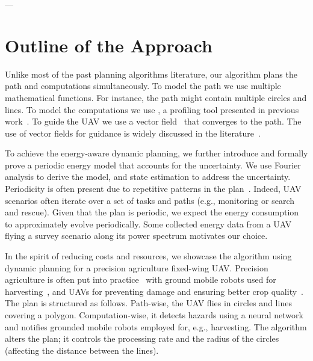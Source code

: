 ---

\section{Outline of the Approach}

Unlike most of the past planning algorithms literature, our algorithm plans the path and computations simultaneously. To model the path we use multiple mathematical functions. For instance, the path might contain multiple circles and lines. To model the computations we use \powprof{}, a profiling tool presented in previous work~\citep{seewald2019coarse}. To guide the UAV we use a vector field~\citep{de2017guidance} that converges to the path. The use of vector fields for guidance is widely discussed in the literature~\citep{lindemann2005smoothly,gonccalves2010vector,panagou2014motion,zhou2014vector,kapitanyuk2017guiding,de2017guidance}. 


To achieve the energy-aware dynamic planning, we further introduce and formally prove a periodic energy model that accounts for the uncertainty. We use Fourier analysis to derive the model, and state estimation to address the uncertainty. Periodicity is often present due to repetitive patterns in the plan~\citep{seewald2020mechanical}. Indeed, UAV scenarios often iterate over a set of tasks and paths (e.g., monitoring or search and rescue). Given that the plan is periodic, we expect the energy consumption to approximately evolve periodically. Some collected energy data from a UAV flying a survey scenario along its power spectrum motivates our choice.


In the spirit of reducing costs and resources, we showcase the algorithm using dynamic planning for a precision agriculture fixed-wing UAV. Precision agriculture is often put into practice~\citep{hajjaj2014review} with ground mobile robots used for harvesting~\citep{qingchun2012study,dong2011development, de2011design, aljanobi2010setup, li2008analysis, edan2000robotic}, and UAVs for preventing damage and ensuring better crop quality~\citep{puri2017agriculture, daponte2019review}. The plan is structured as follows. Path-wise, the UAV flies in circles and lines covering a polygon. Computation-wise, it detects hazards using a neural network and notifies grounded mobile robots employed for, e.g., harvesting. The algorithm alters the plan; it controls the processing rate and the radius of the circles (affecting the distance between the lines). 

